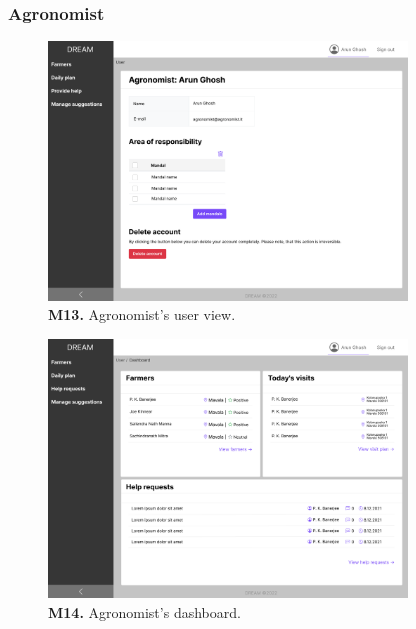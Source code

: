 \subsubsection{Agronomist}

\begin{figure}[H]
    \centering
    \includegraphics[width=0.85\textwidth]{mockups/Agronomist_User.png}
    \caption{\textbf{M13.} Agronomist's user view.}
\end{figure}

\begin{figure}[H]
    \centering
    \includegraphics[width=0.85\textwidth]{mockups/Agronomist_Dashboard.png}
    \caption{\textbf{M14.} Agronomist's dashboard.}
\end{figure}

